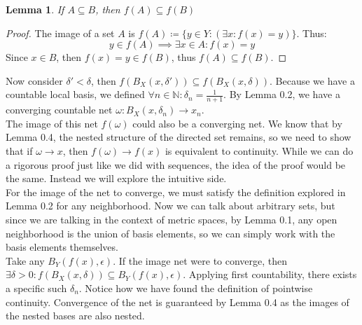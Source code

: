 \documentclass{exam}
\newtheorem{lem}{Lemma}[section]
\begin{document}
\begin{lem}
If $A \subseteq B$, then $f(A) \subseteq f(B)$
\end{lem}
\begin{proof}
The image of a set $A$ is $f(A) \coloneq \{y \in Y: (\exists x: f(x) = y)\}$. Thus:
\begin{equation*}
  y \in f(A) \implies \exists x \in A: f(x) = y
\end{equation*}
Since $x \in B$, then $f(x) = y \in f(B)$, thus $f(A) \subseteq f(B)$. 
\end{proof}
Now consider $\delta' < \delta$, then $f(B_X(x, \delta')) \subseteq f(B_X(x, \delta))$. Because we have a countable local basis, we defined $\forall n \in \mathbb{N}: \delta_n = \frac{1}{n+1}$. By Lemma 0.2, we have a converging countable net $\omega: B_X(x, \delta_n) \xrightarrow{} x_n$.\\

The image of this net $f(\omega)$ could also be a converging net. We know that by Lemma 0.4, the nested structure of the directed set remains, so we need to show that if $\omega \xrightarrow{} x$, then $f(\omega) \xrightarrow{} f(x)$ is equivalent to continuity. While we can do a rigorous proof just like we did with sequences, the idea of the proof would be the same. Instead we will explore the intuitive side.\\

For the image of the net to converge, we must satisfy the definition explored in Lemma 0.2 for any neighborhood. Now we can talk about arbitrary sets, but since we are talking in the context of metric spaces, by Lemma 0.1, any open neighborhood is the union of basis elements, so we can simply work with the basis elements themselves.\\

Take any $B_Y(f(x), \epsilon)$. If the image net were to converge, then $\exists \delta > 0: f(B_X(x, \delta)) \subseteq B_Y(f(x), \epsilon)$. Applying first countability, there exists a specific such $\delta_n$. Notice how we have found the definition of pointwise continuity. Convergence of the net is guaranteed by Lemma 0.4 as the images of the nested bases are also nested. 
\end{document}
